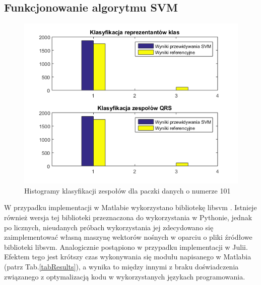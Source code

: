 \subsection{Funkcjonowanie algorytmu SVM}

\begin{figure}[!htp]
	\centering
	\includegraphics[width=15cm]{Grafika/101_2_3}
	\caption{Histogramy klasyfikacji zespołów dla paczki danych o numerze 101}
	\label{fig:hist1}
\end{figure}

\qquad W przypadku implementacji w Matlabie wykorzystano bibliotekę libsvm \cite{csie}. Istnieje również wersja tej biblioteki przeznaczona do wykorzystania w Pythonie, jednak po licznych, nieudanych próbach wykorzystania jej zdecydowano się zaimplementować własną maszynę wektorów nośnych w oparciu o pliki źródłowe biblioteki libsvm. Analogicznie postąpiono w przypadku implementacji w Julii. Efektem tego jest krótszy czas wykonywania się modułu napisanego w Matlabia (patrz Tab.\ref{tabResults}), a wynika to między innymi z braku doświadczenia związanego z optymalizacją kodu w wykorzystanych językach programowania.

